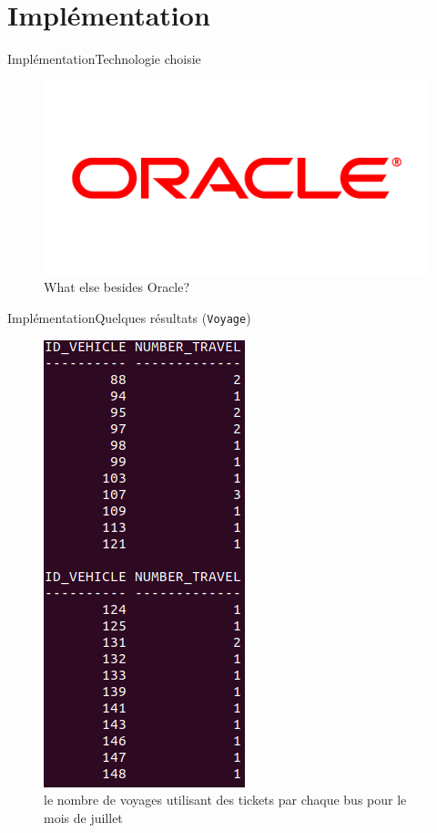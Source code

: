 \documentclass[a4paper,12pt,usenames,dvipsnames]{beamer}
\begin{document}
\section{Implémentation}
\begin{frame}{Implémentation}{Technologie choisie}
\begin{figure}[!ht]
  \centering
  \includegraphics[scale=0.2]{images/Oracle.png}
  \caption{What else besides Oracle?}
\end{figure}
\end{frame}

\begin{frame}{Implémentation}{Quelques résultats (\texttt{Voyage})}
  \begin{figure}[!ht]
    \centering
    \includegraphics[scale=0.3]{images/requetes_analytiques/requ1.png}
    \caption{le nombre de voyages utilisant des tickets par chaque bus pour le mois de juillet}
  \end{figure}
\end{frame}
\end{document}
